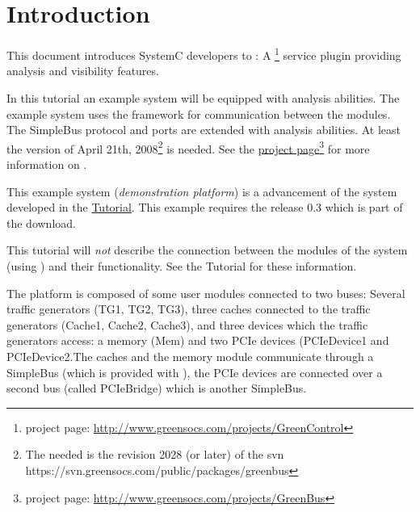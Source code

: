 
\section{Introduction}

This document introduces SystemC developers to \GreenAV: A \hypertarget{GCGreenControl}{\href{http://www.greensocs.com/projects/GreenControl/docs/GCUsersGuide}{\GreenControl}}\footnote{\GreenControl project page: \href{http://www.greensocs.com/projects/GreenControl}{http://www.greensocs.com/projects/GreenControl}} service plugin providing analysis and visibility features.

In this tutorial an example system will be equipped with analysis abilities. The example system uses the \GreenBus framework for communication between the modules. The SimpleBus protocol and ports are extended with analysis abilities. At least the \GreenBus version of April 21th, 2008\footnote{The needed \GreenBus is the revision 2028 (or later) of the svn https://svn.greensocs.com/public/packages/greenbus} is needed. See the \href{http://www.greensocs.com/projects/GreenBus}{\GreenBus project page}\footnote{\GreenBus project page: \href{http://www.greensocs.com/projects/GreenBus}{http://www.greensocs.com/projects/GreenBus}} for more information on \GreenBus.


This example system ({\em demonstration platform}) is a advancement of the system developed in the \hypertarget{GCnfTutorial}{\href{http://www.greensocs.com/projects/GreenControl/GreenConfig/docs/GCnfTutorial}{\GreenConfig Tutorial}}. This example requires the \GreenConfig release 0.3 which is part of the \GreenAV download.

This tutorial will {\em not} describe the connection between the modules of the system (using
\GreenBus) and their functionality. See the \GreenConfig Tutorial for these information.

The platform is composed of some user modules connected to two buses: Several traffic generators ({\sffamily TG1}, {\sffamily TG2}, {\sffamily TG3}), three caches connected to the traffic generators ({\sffamily Cache1}, {\sffamily Cache2}, {\sffamily Cache3}), and three devices which the traffic generators access: a memory ({\sffamily Mem}) and two PCIe devices
({\sffamily PCIeDevice1} and {\sffamily PCIeDevice2}.The caches and the memory module communicate through a SimpleBus (which is provided with \GreenBus), the PCIe devices are connected over a second bus (called {\sffamily PCIeBridge}) which is another SimpleBus.

